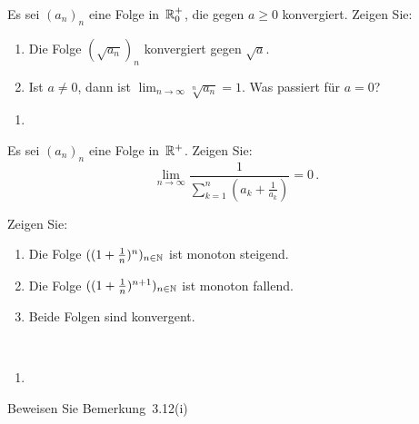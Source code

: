 \bigskip

\begin{aufg}[6 Punkte]
Es sei $(a_n)_n$ eine Folge in~$\mathbb{R}^+_0$, die gegen $a\geq 0$ konvergiert. Zeigen  Sie:
\begin{enumerate}[label=$\mathrm{(\roman*)}$, ref=$\mathrm{\roman*}$]
 \item Die Folge $(\sqrt{a_n})_n$ konvergiert gegen $\sqrt{a}$.
 \item Ist $a\not=0$, dann ist $\lim_{n\to\infty} \sqrt[n]{a_n} = 1$. Was passiert f\"ur $a=0$?
\end{enumerate}
\end{aufg}
 
\bigskip

\begin{lsg}
\begin{enumerate}[label=$\mathrm{(\roman*)}$, ref=$\mathrm{\roman*}$]
\item 
\end{enumerate}
\end{lsg}


\bigskip


\begin{aufg}[6 Punkte]
Es sei $(a_n)_n$ eine Folge in~$\mathbb{R}^+$. Zeigen Sie:
\[
 \lim_{n\to\infty} \frac{1}{\sum_{k=1}^n (a_k + \frac{1}{a_k})} = 0\,.
\]
\end{aufg}

\bigskip

\begin{lsg}  
\end{lsg}

\bigskip


\begin{aufg}[6 Punkte]
Zeigen Sie: 
\begin{enumerate}[label=$\mathrm{(\roman*)}$, ref=$\mathrm{\roman*}$]
\item Die Folge $((1+\frac{1}{n})^n)_{n\in\mathbb{N}}$ ist monoton steigend.
\item Die Folge $((1+\frac{1}{n})^{n+1})_{n\in\mathbb{N}}$ ist monoton fallend.
\item Beide Folgen sind konvergent. 
\end{enumerate}
\end{aufg}
 
\bigskip

\begin{lsg}\mbox{ }
\begin{enumerate}[label=$\mathrm{(\roman*)}$, ref=$\mathrm{\roman*}$]
\item 
\end{enumerate}
\end{lsg}

\bigskip

\begin{aufg}
 Beweisen Sie Bemerkung~3.12(i)
\end{aufg}

\bigskip

\begin{lsg}
\end{lsg}
 
